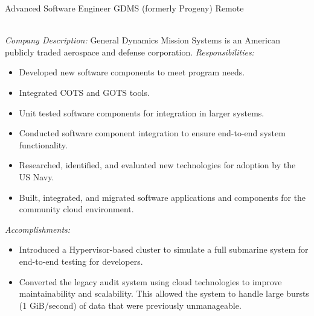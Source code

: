 \begin{samepage}
	{Advanced Software Engineer}
	{GDMS (formerly Progeny)}
	{Remote}{} %
	{
		\emph{\\Company Description:}
		General Dynamics Mission Systems is an American publicly traded aerospace and
		defense corporation.
		\newline{}
		\newline{}
		\emph{Responsibilities:}
		\begin{itemize}
			\item Developed new software components to meet program needs.
			\item Integrated COTS and GOTS tools.
			\item Unit tested software components for integration in larger systems.
			\item Conducted software component integration to ensure end-to-end system functionality.
			\item Researched, identified, and evaluated new technologies for adoption by the US Navy.
			\item Built, integrated, and migrated software applications and components for the community cloud environment.\\
		\end{itemize}
		\emph{Accomplishments:}
		\begin{itemize}
			\item Introduced a Hypervisor-based cluster to simulate a full submarine system for end-to-end testing for developers.
			\item Converted the legacy audit system using cloud technologies to improve maintainability and scalability.
			      This allowed the system to handle large bursts (1 GiB/second) of data that were previously unmanageable.\\
		\end{itemize}
	}
\end{samepage}
